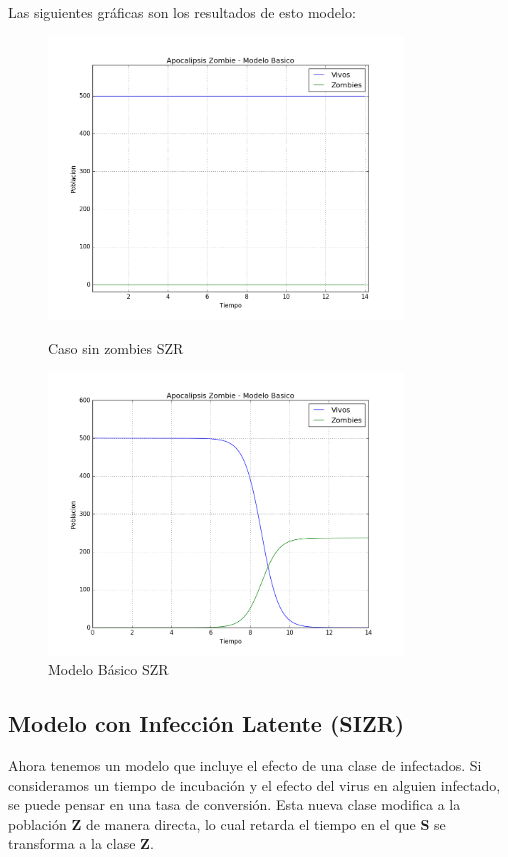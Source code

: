 \documentclass[12pt]{article}
\begin{document}
Las siguientes gráficas son los resultados de esto modelo:
\begin{figure}[H]
\centering
\includegraphics[height=7.5cm]{BasicoE.png}
\caption{Caso sin zombies SZR}
\includegraphics[height=7.5cm]{BasicoR.png}
\caption{Modelo Básico SZR}
\end{figure} 

\subsection{Modelo con Infección Latente (SIZR)}
Ahora tenemos un modelo que incluye el efecto de una clase de infectados. Si consideramos un tiempo de incubación y el efecto del virus en alguien infectado, se puede pensar en una tasa de conversión. Esta nueva clase modifica a la población \textbf{Z} de manera directa, lo cual retarda el tiempo en el que \textbf{S} se transforma a la clase \textbf{Z}.
\end{document}
